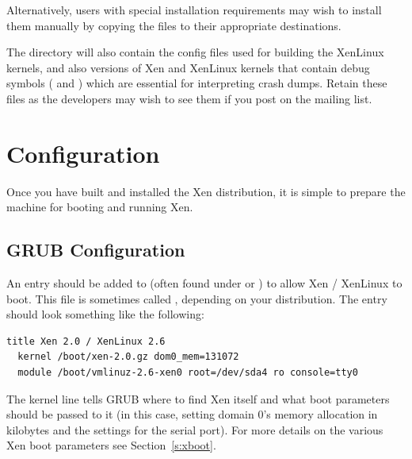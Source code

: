 \documentclass[11pt,twoside,final,openright]{report}
\begin{document}
Alternatively, users with special installation requirements may wish
to install them manually by copying the files to their appropriate
destinations.


The  directory will also contain the config files
used for building the XenLinux kernels, and also versions of Xen and
XenLinux kernels that contain debug symbols ( and
) which are essential for interpreting crash
dumps.  Retain these files as the developers may wish to see them if
you post on the mailing list.





\section{Configuration}
\label{s:configure}
Once you have built and installed the Xen distribution, it is 
simple to prepare the machine for booting and running Xen. 

\subsection{GRUB Configuration}

An entry should be added to  (often found under
 or ) to allow Xen / XenLinux to boot.
This file is sometimes called , depending on your
distribution.  The entry should look something like the following:

{\small
\begin{verbatim}
title Xen 2.0 / XenLinux 2.6
  kernel /boot/xen-2.0.gz dom0_mem=131072
  module /boot/vmlinuz-2.6-xen0 root=/dev/sda4 ro console=tty0
\end{verbatim}
}

The kernel line tells GRUB where to find Xen itself and what boot
parameters should be passed to it (in this case, setting domain 0's
memory allocation in kilobytes and the settings for the serial port). For more
details on the various Xen boot parameters see Section~\ref{s:xboot}. 
\end{document}
